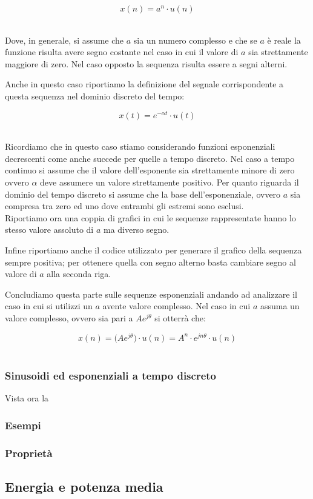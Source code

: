 \documentclass[../main.tex]{subfiles}
\begin{document}
\[ x(n) = a^n \cdot u(n) \]\

Dove, in generale, si assume che $a$ sia un numero complesso e che se $a$ è reale la funzione risulta avere segno costante nel caso in cui il valore di $a$ sia strettamente maggiore di zero. Nel caso opposto la sequenza risulta essere a segni alterni.

Anche in questo caso riportiamo la definizione del segnale corrispondente a questa sequenza nel dominio discreto del tempo:

\[ x(t) = e^{-\alpha t} \cdot u(t) \]\

Ricordiamo che in questo caso stiamo considerando funzioni esponenziali decrescenti come anche succede per quelle a tempo discreto. Nel caso a tempo continuo si assume che il valore dell'esponente sia strettamente minore di zero ovvero $\alpha$ deve assumere un valore strettamente positivo. Per quanto riguarda il dominio del tempo discreto si assume che la base dell'esponenziale, ovvero $a$ sia compresa tra zero ed uno dove entrambi gli estremi sono esclusi.\\

Riportiamo ora una coppia di grafici in cui le sequenze rappresentate hanno lo stesso valore assoluto di $a$ ma diverso segno.

Infine riportiamo anche il codice utilizzato per generare il grafico della sequenza sempre positiva; per ottenere quella con segno alterno basta cambiare segno al valore di $a$ alla seconda riga.



Concludiamo questa parte sulle sequenze esponenziali andando ad analizzare il caso in cui si utilizzi un $a$ avente valore complesso.
Nel caso in cui $a$ assuma un valore complesso, ovvero sia pari a $Ae^{j\theta}$ si otterrà che:

\[x(n) = \big( Ae^{j\theta} \big) \cdot u(n) = A^n \cdot e^{jn \theta} \cdot u(n) \]\


\subsubsection{Sinusoidi ed esponenziali a tempo discreto}

Vista ora la

\subsubsection{Esempi}
\subsubsection{Proprietà}



\subsection{Energia e potenza media}
\end{document}
